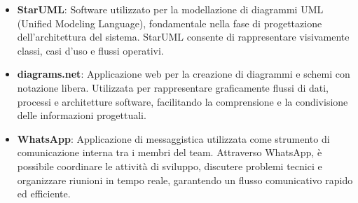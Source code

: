 \begin{itemize}
    \item \textbf{StarUML}: Software utilizzato per la modellazione di diagrammi UML (Unified Modeling Language), fondamentale nella fase di progettazione dell'architettura del sistema. StarUML consente di rappresentare visivamente classi, casi d’uso e flussi operativi.

    \item \textbf{diagrams.net}: Applicazione web per la creazione di diagrammi e schemi con notazione libera. Utilizzata per rappresentare graficamente flussi di dati, processi e architetture software, facilitando la comprensione e la condivisione delle informazioni progettuali.

    \item \textbf{WhatsApp}: Applicazione di messaggistica utilizzata come strumento di comunicazione interna tra i membri del team. Attraverso WhatsApp, è possibile coordinare le attività di sviluppo, discutere problemi tecnici e organizzare riunioni in tempo reale, garantendo un flusso comunicativo rapido ed efficiente.

\end{itemize}
